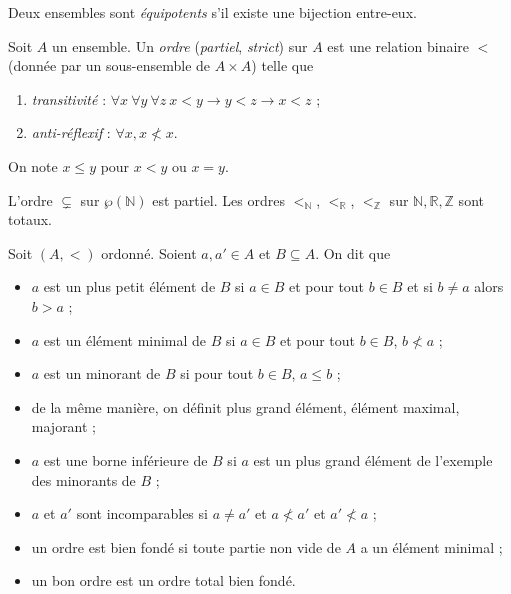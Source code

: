 \documentclass[./main]{subfiles}
\begin{document}
  \begin{defn}
    Deux ensembles sont \textit{équipotents} s'il existe une bijection entre-eux.
  \end{defn}

  \begin{defn}
    Soit $A$ un ensemble.
    Un \textit{ordre} (\textit{partiel}, \textit{strict}) sur $A$ est une relation binaire $<$ (donnée par un sous-ensemble de $A \times A$) telle que 
    \begin{enumerate}
      \item \textit{transitivité} : $\forall x \: \forall y \: \forall z \: x < y \to y < z \to x < z$ ;
      \item \textit{anti-réflexif} : $\forall x, x \not< x$.
    \end{enumerate}
  \end{defn}

  \begin{nota}
    On note $x \le y$ pour $x < y$ ou $x = y$.
  \end{nota}

  \begin{exm}
    L'ordre $\subsetneq$ sur $\wp(\mathds{N})$ est partiel.
    Les ordres $<_\mathds{N}$, $<_\mathds{R}$, $<_\mathds{Z}$ sur $\mathds{N}, \mathds{R}, \mathds{Z}$ sont totaux.
  \end{exm}

  \begin{defn}
    Soit $(A, <)$ ordonné. Soient  $a, a' \in A$ et $B \subseteq A$.
    On dit que 
    \begin{itemize}
      \item $a$ est un plus petit élément de $B$ si $a \in B$ et pour tout $b \in B$ et si $b \neq a$ alors $b > a$ ;
      \item $a$ est un élément minimal de $B$ si $a \in B$  et pour tout $b \in B$, $b \not< a$ ;
      \item $a$ est un minorant de $B$ si pour tout $b \in B$, $a \le b$ ;
      \item de la même manière, on définit plus grand élément, élément maximal, majorant ;
      \item $a$ est une borne inférieure de $B$ si $a$ est un plus grand élément de l'exemple des minorants de $B$ ;
      \item $a$ et $a'$ sont incomparables si $a \neq a'$ et $a \not< a'$ et $a' \not< a$ ;
      \item un ordre est bien fondé si toute partie non vide de  $A$ a un élément minimal ;
      \item un bon ordre est un ordre total bien fondé.
    \end{itemize}
  \end{defn}
\end{document}
